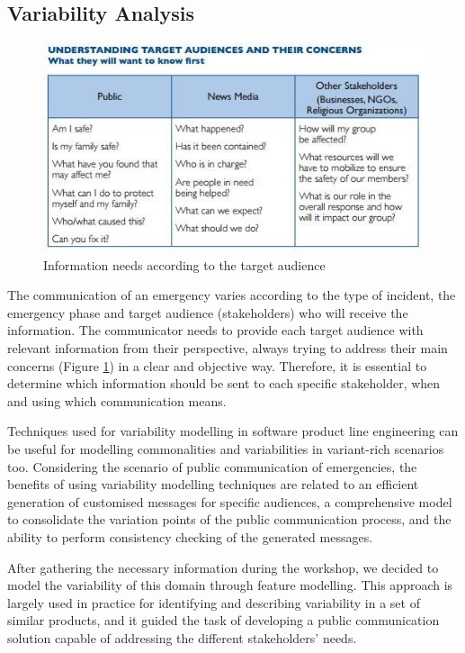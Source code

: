 \subsection{Variability Analysis}

\begin{figure}
\begin{center}
  \includegraphics[width=\linewidth]{images/informationsNeeds.jpg}
\caption{Information needs according to the target audience \citep{panamericanhealthorganization2009}}
\label{fig:informationNeeds}
\end{center}
\end{figure}

The communication of an emergency varies according to the type of incident, the emergency phase and target audience (stakeholders) who will receive the information. The communicator needs
to provide each target audience with relevant information from their perspective, always trying to address their main concerns (Figure \ref{fig:informationNeeds}) in a clear and objective way. Therefore, it is essential to determine which information should be sent to each specific stakeholder, when and using which communication means.

Techniques used for variability modelling in software product line engineering can be useful for modelling commonalities and variabilities in variant-rich scenarios too. Considering the scenario of public communication of emergencies, the benefits of using variability modelling techniques are related to an efficient generation of customised messages for specific audiences, a comprehensive model to consolidate the variation points of the public communication process, and the ability to perform consistency checking of the generated messages.

After gathering the necessary information during the workshop, we decided to model the variability of this domain through feature modelling. This approach is largely used in practice for identifying and describing variability in a set of similar products, and it guided the task of developing a public communication solution capable of addressing the different stakeholders’ needs. 

